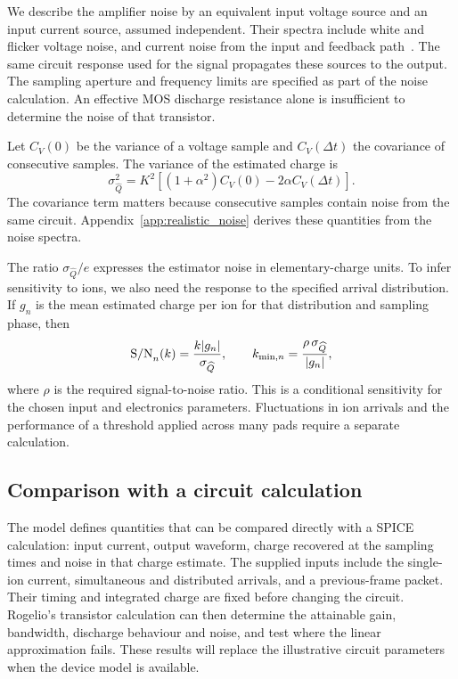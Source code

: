 We describe the amplifier noise by an equivalent input voltage source and an input current source, assumed independent. Their spectra include white and flicker voltage noise, and current noise from the input and feedback path~\cite{tiNoise2007,spielerNoise1998}. The same circuit response used for the signal propagates these sources to the output. The sampling aperture and frequency limits are specified as part of the noise calculation. An effective MOS discharge resistance alone is insufficient to determine the noise of that transistor.

Let $C_V(0)$ be the variance of a voltage sample and $C_V(\Delta t)$ the covariance of consecutive samples. The variance of the estimated charge is
\begin{equation}
 \sigma_{\widehat Q}^{2}
 =K^2\left[(1+\alpha^2)C_V(0)-2\alpha C_V(\Delta t)\right].
 \label{eq:realistic_noise_charge}
\end{equation}
The covariance term matters because consecutive samples contain noise from the same circuit. Appendix~\ref{app:realistic_noise} derives these quantities from the noise spectra.

The ratio $\sigma_{\widehat Q}/e$ expresses the estimator noise in elementary-charge units. To infer sensitivity to ions, we also need the response to the specified arrival distribution. If $g_n$ is the mean estimated charge per ion for that distribution and sampling phase, then
\begin{equation}
 {\rm S/N}_n(k)=\frac{k|g_n|}{\sigma_{\widehat Q}},\qquad
 k_{\min,n}=\frac{\rho\,\sigma_{\widehat Q}}{|g_n|},
 \label{eq:realistic_sensitivity}
\end{equation}
where $\rho$ is the required signal-to-noise ratio. This is a conditional sensitivity for the chosen input and electronics parameters. Fluctuations in ion arrivals and the performance of a threshold applied across many pads require a separate calculation.

\subsection{Comparison with a circuit calculation}

The model defines quantities that can be compared directly with a SPICE calculation: input current, output waveform, charge recovered at the sampling times and noise in that charge estimate. The supplied inputs include the single-ion current, simultaneous and distributed arrivals, and a previous-frame packet. Their timing and integrated charge are fixed before changing the circuit. Rogelio's transistor calculation can then determine the attainable gain, bandwidth, discharge behaviour and noise, and test where the linear approximation fails. These results will replace the illustrative circuit parameters when the device model is available.

